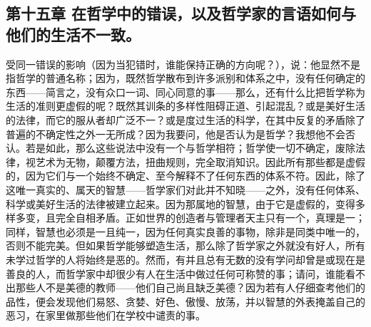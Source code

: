 
\subsection{第十五章 在哲学中的错误，以及哲学家的言语如何与他们的生活不一致。}

受同一错误的影响（因为当犯错时，谁能保持正确的方向呢？），说：他显然不是指哲学的普通名称；因为，既然哲学散布到许多派别和体系之中，没有任何确定的东西——简言之，没有众口一词、同心同意的事——那么，还有什么比把哲学称为生活的准则更虚假的呢？既然其训条的多样性阻碍正道、引起混乱？或是美好生活的法律，而它的服从者却广泛不一？或是度过生活的科学，在其中反复的矛盾除了普遍的不确定性之外一无所成？因为我要问，他是否认为是哲学？我想他不会否认。若是如此，那么这些说法中没有一个与哲学相符；哲学使一切不确定，废除法律，视艺术为无物，颠覆方法，扭曲规则，完全取消知识。因此所有那些都是虚假的，因为它们与一个始终不确定、至今解释不了任何东西的体系不符。因此，除了这唯一真实的、属天的智慧——哲学家们对此并不知晓——之外，没有任何体系、科学或美好生活的法律被建立起来。因为那属地的智慧，由于它是虚假的，变得多样多变，且完全自相矛盾。正如世界的创造者与管理者天主只有一个，真理是一；同样，智慧也必须是一且纯一，因为任何真实良善的事物，除非是同类中唯一的，否则不能完美。但如果哲学能够塑造生活，那么除了哲学家之外就没有好人，所有未学过哲学的人将始终是恶的。然而，有并且总有无数的没有学问却曾是或现在是善良的人，而哲学家中却很少有人在生活中做过任何可称赞的事；请问，谁能看不出那些人不是美德的教师——他们自己尚且缺乏美德？因为若有人仔细查考他们的品性，便会发现他们易怒、贪婪、好色、傲慢、放荡，并以智慧的外表掩盖自己的恶习，在家里做那些他们在学校中谴责的事。\par

